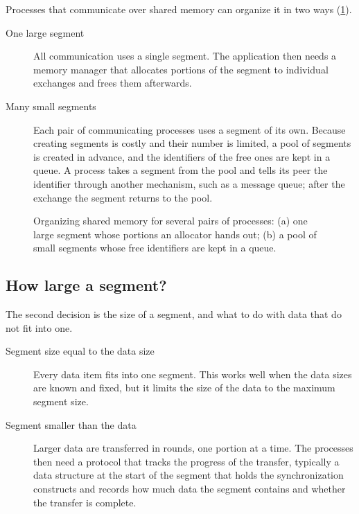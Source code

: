 \documentclass[../main.tex]{subfiles}
\begin{document}
Processes that communicate over shared memory can organize it in two ways
(\cref{fig:l09-segments}).
\begin{description}
  \item[One large segment] All communication uses a single segment.  The
    application then needs a memory manager that allocates portions of the
    segment to individual exchanges and frees them afterwards.
  \item[Many small segments] Each pair of communicating processes uses a
    segment of its own.  Because creating segments is costly and their
    number is limited, a pool of segments is created in advance, and the
    identifiers of the free ones are kept in a queue.  A process
    takes a segment from the pool and tells its peer the identifier through
    another mechanism, such as a message queue; after the exchange the
    segment returns to the pool.
\end{description}

\begin{figure}[htbp]
  \centering
  
  \caption{Organizing shared memory for several pairs of processes:
    (a) one large segment whose portions an allocator hands out;
    (b) a pool of small segments whose free identifiers are kept in a queue.}
  \label{fig:l09-segments}
\end{figure}

\subsection{How large a segment?}

The second decision is the size of a segment, and what to do with data that
do not fit into one.
\begin{description}
  \item[Segment size equal to the data size] Every data item fits into one
    segment.  This works well when the data sizes are known and fixed, but
    it limits the size of the data to the maximum segment size.
  \item[Segment smaller than the data] Larger data are transferred in
    rounds, one portion at a time.  The processes then need a protocol that
    tracks the progress of the transfer, typically a data structure at the
    start of the segment that holds the synchronization constructs and
    records how much data the segment contains and whether the transfer is
    complete.
\end{description}
\end{document}
